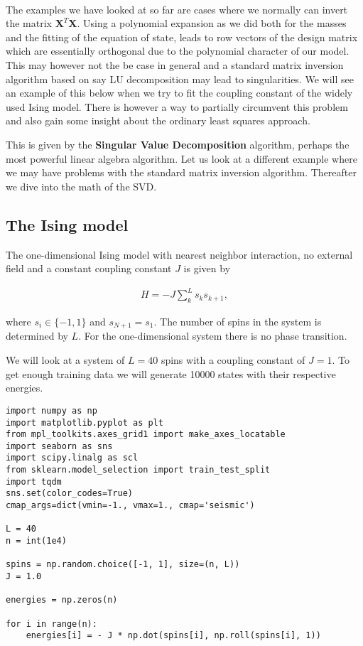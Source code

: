 \documentclass[%
oneside,                 %
final,                   %
10pt]{article}
\begin{document}
\paragraph{}

The examples we have looked at so far are cases where we normally can
invert the matrix $\bm{X}^T\bm{X}$. Using a polynomial expansion as we
did both for the masses and the fitting of the equation of state,
leads to row vectors of the design matrix which are essentially
orthogonal due to the polynomial character of our model. This may
however not the be case in general and a standard matrix inversion
algorithm based on say LU decomposition may lead to singularities. We will see an example of this below when we try to fit
the coupling constant of the widely used Ising model. 
There is however a way to partially circumvent this problem and also gain some insight about the ordinary least squares approach. 

This is given by the \textbf{Singular Value Decomposition} algorithm, perhaps
the most powerful linear algebra algorithm.  Let us look at a
different example where we may have problems with the standard matrix
inversion algorithm. Thereafter we dive into the math of the SVD.



\subsection*{The Ising model}

The one-dimensional Ising model with nearest neighbor interaction, no
external field and a constant coupling constant $J$ is given by

\begin{align}
    H = -J \sum_{k}^L s_k s_{k + 1},
\end{align}

where $s_i \in \{-1, 1\}$ and $s_{N + 1} = s_1$. The number of spins
in the system is determined by $L$. For the one-dimensional system
there is no phase transition.

We will look at a system of $L = 40$ spins with a coupling constant of
$J = 1$. To get enough training data we will generate 10000 states
with their respective energies.


\begin{verbatim}
import numpy as np
import matplotlib.pyplot as plt
from mpl_toolkits.axes_grid1 import make_axes_locatable
import seaborn as sns
import scipy.linalg as scl
from sklearn.model_selection import train_test_split
import tqdm
sns.set(color_codes=True)
cmap_args=dict(vmin=-1., vmax=1., cmap='seismic')

L = 40
n = int(1e4)

spins = np.random.choice([-1, 1], size=(n, L))
J = 1.0

energies = np.zeros(n)

for i in range(n):
    energies[i] = - J * np.dot(spins[i], np.roll(spins[i], 1))
\end{verbatim}
\end{document}
